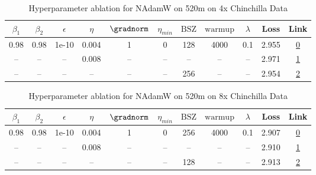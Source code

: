 \begin{table}[H]
\centering
\caption{Hyperparameter ablation for NAdamW on 520m on 4x Chinchilla Data}
\label{tab:ablation_nadamw_520m_on_4x_chinchilla_data}
\begin{tabular}{ccccccccccc}
\toprule
$\beta_1$ & $\beta_2$ & $\epsilon$ & $\eta$ & $\gradnorm$ & $\eta_{min}$ & $\mathrm{BSZ}$ & $\mathrm{warmup}$ & $\lambda$ & Loss & Link \\
\midrule
0.98 & 0.98 & 1e-10 & 0.004 & 1 & 0 & 128 & 4000 & 0.1 & 2.955 & \href{https://wandb.ai/stanford-mercury/optimizer-scaling/runs/sweep-520m-42B-nadamwcf9d95lr0.004-wd0.1-minlr0-warmup4000-b10.9-40428f}{0} \\
\midrule
-- & -- & -- & 0.008 & -- & -- & -- & -- & -- & 2.971 & \href{https://wandb.ai/stanford-mercury/optimizer-scaling/runs/sweep-520m-42B-nadamwbd85falr0.008-wd0.1-minlr0-warmup4000-b10.9-2ceead}{1} \\
-- & -- & -- & -- & -- & -- & 256 & -- & -- & 2.954 & \href{https://wandb.ai/stanford-mercury/optimizer-scaling/runs/sweep-520m-42B-nadamw0a1fe6lr0.004-wd0.1-minlr0-warmup4000-b10.9-2395f8}{2} \\
\bottomrule
\end{tabular}
\end{table}

\begin{table}[H]
\centering
\caption{Hyperparameter ablation for NAdamW on 520m on 8x Chinchilla Data}
\label{tab:ablation_nadamw_520m_on_8x_chinchilla_data}
\begin{tabular}{ccccccccccc}
\toprule
$\beta_1$ & $\beta_2$ & $\epsilon$ & $\eta$ & $\gradnorm$ & $\eta_{min}$ & $\mathrm{BSZ}$ & $\mathrm{warmup}$ & $\lambda$ & Loss & Link \\
\midrule
0.98 & 0.98 & 1e-10 & 0.004 & 1 & 0 & 256 & 4000 & 0.1 & 2.907 & \href{https://wandb.ai/stanford-mercury/optimizer-scaling/runs/sweep-520m-85B-nadamwcf9d95lr0.004-wd0.1-minlr0-warmup4000-b10.9-d09912}{0} \\
\midrule
-- & -- & -- & 0.008 & -- & -- & -- & -- & -- & 2.910 & \href{https://wandb.ai/stanford-mercury/optimizer-scaling/runs/sweep-520m-85B-nadamwpbd85falr0.008-wd0.1-minlr0-warmup4000-b10.-9c80f6}{1} \\
-- & -- & -- & -- & -- & -- & 128 & -- & -- & 2.913 & \href{https://wandb.ai/stanford-mercury/optimizer-scaling/runs/sweep-520m-85B-nadamwpe2b0f0lr0.004-wd0.1-minlr0-warmup4000-b10.-262c7c}{2} \\
\bottomrule
\end{tabular}
\end{table}

